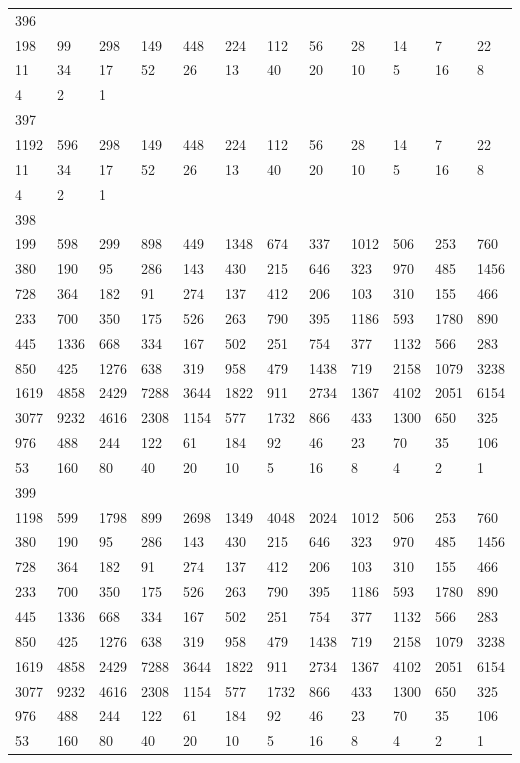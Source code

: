 \begin{longtable}{llllllllllll}
396&&&&&&&&&&&\\
198& 99& 298& 149& 448& 224& 112& 56& 28& 14& 7& 22\\
11& 34& 17& 52& 26& 13& 40& 20& 10& 5& 16& 8\\
4& 2& 1& \\

397&&&&&&&&&&&\\
1192& 596& 298& 149& 448& 224& 112& 56& 28& 14& 7& 22\\
11& 34& 17& 52& 26& 13& 40& 20& 10& 5& 16& 8\\
4& 2& 1& \\

398&&&&&&&&&&&\\
199& 598& 299& 898& 449& 1348& 674& 337& 1012& 506& 253& 760\\
380& 190& 95& 286& 143& 430& 215& 646& 323& 970& 485& 1456\\
728& 364& 182& 91& 274& 137& 412& 206& 103& 310& 155& 466\\
233& 700& 350& 175& 526& 263& 790& 395& 1186& 593& 1780& 890\\
445& 1336& 668& 334& 167& 502& 251& 754& 377& 1132& 566& 283\\
850& 425& 1276& 638& 319& 958& 479& 1438& 719& 2158& 1079& 3238\\
1619& 4858& 2429& 7288& 3644& 1822& 911& 2734& 1367& 4102& 2051& 6154\\
3077& 9232& 4616& 2308& 1154& 577& 1732& 866& 433& 1300& 650& 325\\
976& 488& 244& 122& 61& 184& 92& 46& 23& 70& 35& 106\\
53& 160& 80& 40& 20& 10& 5& 16& 8& 4& 2& 1\\

399&&&&&&&&&&&\\
1198& 599& 1798& 899& 2698& 1349& 4048& 2024& 1012& 506& 253& 760\\
380& 190& 95& 286& 143& 430& 215& 646& 323& 970& 485& 1456\\
728& 364& 182& 91& 274& 137& 412& 206& 103& 310& 155& 466\\
233& 700& 350& 175& 526& 263& 790& 395& 1186& 593& 1780& 890\\
445& 1336& 668& 334& 167& 502& 251& 754& 377& 1132& 566& 283\\
850& 425& 1276& 638& 319& 958& 479& 1438& 719& 2158& 1079& 3238\\
1619& 4858& 2429& 7288& 3644& 1822& 911& 2734& 1367& 4102& 2051& 6154\\
3077& 9232& 4616& 2308& 1154& 577& 1732& 866& 433& 1300& 650& 325\\
976& 488& 244& 122& 61& 184& 92& 46& 23& 70& 35& 106\\
53& 160& 80& 40& 20& 10& 5& 16& 8& 4& 2& 1\\


\end{longtable}
